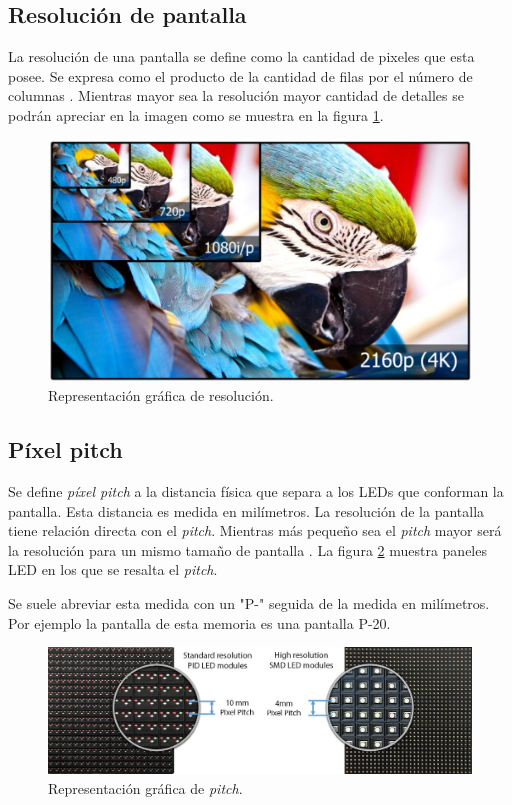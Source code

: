 \subsection{Resolución de pantalla}
La resolución de una pantalla se define como la cantidad de pixeles que esta posee. Se expresa como el producto de la cantidad de filas por el número de columnas \citep{WIKIRESOL}. Mientras mayor sea la resolución mayor cantidad de detalles se podrán apreciar en la imagen como se muestra en la figura \ref{fig:grafresolucion}.
\begin{figure}[htpb]
	\centering
	\includegraphics[scale=0.3]{Figures/resolucion.jpg} 
	\caption{Representación gráfica de resolución\protect\footnotemark.}
	\label{fig:grafresolucion}
\end{figure}

\subsection{Píxel pitch}
Se define \textit{píxel pitch} a la distancia física que separa a los LEDs que conforman la pantalla. Esta distancia es medida en milímetros. La resolución de la pantalla tiene relación directa con el \textit{pitch}. Mientras más pequeño sea el \textit{pitch} mayor será la resolución para un mismo tamaño de pantalla \citep{IMAGENDEF2}. La figura \ref{fig:pixelpitch} muestra paneles LED en los que se resalta el \textit{pitch}.

Se suele abreviar esta medida con un "P-" seguida de la medida en milímetros. Por ejemplo la pantalla de esta memoria es una pantalla P-20.

\begin{figure}[htpb]
	\centering
	\includegraphics[scale=0.3]{Figures/pitch.jpg} 
	\caption{Representación gráfica de \textit{pitch}\protect\footnotemark.}
	\label{fig:pixelpitch}
\end{figure}

